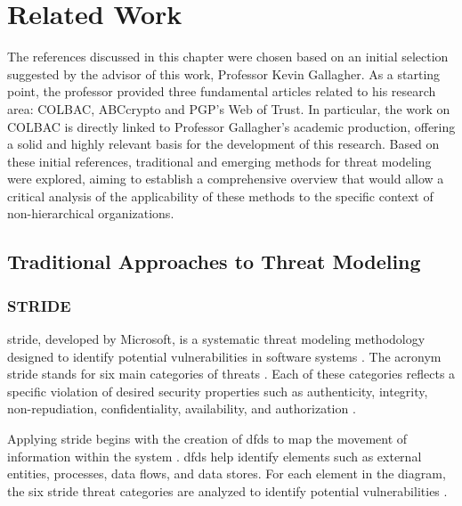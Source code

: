 
%

\chapter{Related Work}
\label{cha:related_work}

The references discussed in this chapter were chosen based on an initial
selection suggested by the advisor of this work, Professor Kevin Gallagher. As a
starting point, the professor provided three fundamental articles related to his
research area: COLBAC, ABCcrypto and PGP's Web of Trust. In particular, the work
on COLBAC is directly linked to Professor Gallagher's academic production,
offering a solid and highly relevant basis for the development of this research.
Based on these initial references, traditional and emerging methods for threat
modeling were explored, aiming to establish a comprehensive overview that would
allow a critical analysis of the applicability of these methods to the specific
context of non-hierarchical organizations.

\glsresetall

\section{Traditional Approaches to Threat Modeling}
\label{sec:traditional_approaches_threat_modeling}

\subsection{STRIDE}
\label{subsec:stride}

\gls{stride}, developed by Microsoft, is a systematic threat modeling
methodology designed to identify potential vulnerabilities in software systems
\cite{MicrosoftThreatModelingTechnique}. The acronym \gls{stride} stands for six
main categories of threats \cite{ThreatModelingdesigningForSecurity}. Each of
these categories reflects a specific violation of desired security properties
such as authenticity, integrity, non-repudiation, confidentiality, availability,
and authorization \cite{MicrosoftThreatModelingTechnique}.

Applying \gls{stride} begins with the creation of \gls{dfds} to map the movement
of information within the system \cite{UncoverSecurityDesignFlawsSTRIDE}.
\gls{dfds} help identify elements such as external entities, processes, data
flows, and data stores. For each element in the diagram, the six \gls{stride}
threat categories are analyzed to identify potential vulnerabilities
\cite{ThreatModelingdesigningForSecurity}.

